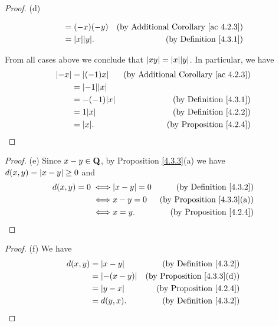 \begin{proof}{(d)}
\begin{itemize}
\begin{itemize}
\begin{align*}
                                     & = (-x)(-y)         & \text{(by Additional Corollary \ref{ac 4.2.3})} \\
                                     & = \abs{x} \abs{y}. & \text{(by Definition \ref{4.3.1})}
                        \end{align*}
              \end{itemize}
    \end{itemize}
    From all cases above we conclude that \(\abs{xy} = \abs{x} \abs{y}\).
    In particular, we have
    \begin{align*}
        \abs{-x} & = \abs{(-1)x}      & \text{(by Additional Corollary \ref{ac 4.2.3})} \\
                 & = \abs{-1} \abs{x}                                                   \\
                 & = -(-1) \abs{x}    & \text{(by Definition \ref{4.3.1})}              \\
                 & = 1 \abs{x}        & \text{(by Definition \ref{4.2.2})}              \\
                 & = \abs{x}.         & \text{(by Proposition \ref{4.2.4})}
    \end{align*}
\end{proof}

\begin{proof}{(e)}
    Since \(x - y \in \mathbf{Q}\), by Proposition \ref{4.3.3}(a) we have \(d(x, y) = \left\lvert x - y\right\rvert \geq 0\) and
    \begin{align*}
        d(x, y) = 0
        \iff & \abs{x - y} = 0 & \text{(by Definition \ref{4.3.2})}     \\
        \iff & x - y = 0       & \text{(by Proposition \ref{4.3.3}(a))} \\
        \iff & x = y.          & \text{(by Proposition \ref{4.2.4})}
    \end{align*}
\end{proof}

\begin{proof}{(f)}
    We have
    \begin{align*}
        d(x, y) & = \left\lvert x - y\right\rvert    & \text{(by Definition \ref{4.3.2})}     \\
                & = \left\lvert-(x - y)\right\rvert & \text{(by Proposition \ref{4.3.3}(d))} \\
                & = \left\lvert y - x\right\rvert    & \text{(by Proposition \ref{4.2.4})}    \\
                & = d(y, x).       & \text{(by Definition \ref{4.3.2})}
    \end{align*}
\end{proof}

